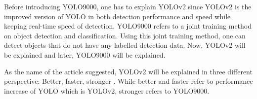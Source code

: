 \documentclass{article}
\begin{document}
\setlength{\parindent}{6ex}

\indent

Before introducing YOLO9000, one has to explain YOLOv2 since YOLOv2 is the 
improved version of YOLO in both detection performance and speed while keeping 
real-time speed of detection. YOLO9000 refers to a joint training method on 
object detection and classification. Using this joint training method, one can 
detect objects that do not have any labelled detection data. Now, YOLOv2 will be 
explained and later, YOLO9000 will be explained. \par

As the name of the article suggested, YOLOv2 will be explained in three 
different perspective: Better, faster, stronger \cite{yolo9000cite}. While better and faster 
refer to performance increase of YOLO which is YOLOv2, stronger refers to 
YOLO9000. 
\end{document}
